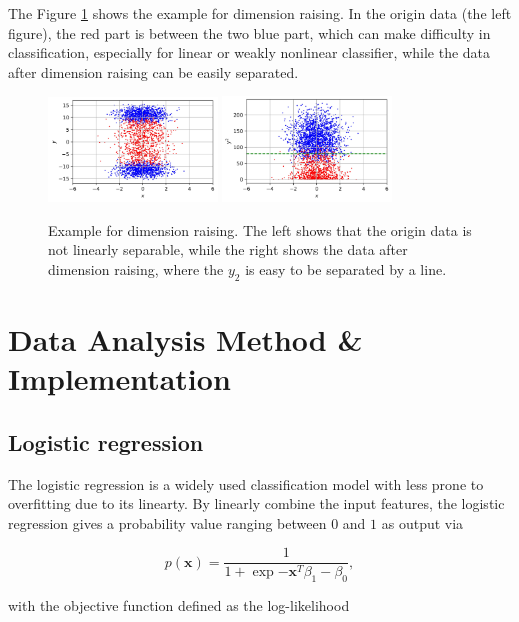 \documentclass[11pt]{article}
\begin{document}
The Figure \ref{sample-raising} shows the example for dimension raising. In the origin data (the left figure), the red part is between the two blue part, which can make difficulty in classification, especially for linear or weakly nonlinear classifier, while the data after dimension raising can be easily separated.

\begin{figure}[H]
  \centering
  \includegraphics[width=0.4\textwidth]{./figure/Sample-Raising-1.jpg}
  \includegraphics[width=0.4\textwidth]{./figure/Sample-Raising-2.jpg}
  \caption{Example for dimension raising. The left shows that the origin data is not linearly separable, while the right shows the data after dimension raising, where the $y_2$ is easy to be separated by a line.}
  \label{sample-raising}
\end{figure}

\section{Data Analysis Method \& Implementation}

\subsection{Logistic regression}

The logistic regression \cite{walker1967estimation} \cite{pohar2004comparison} is a widely used classification model with less prone to overfitting due to its linearty. By linearly combine the input features, the logistic regression gives a probability value ranging between $0$ and $1$ as output via

$$
  p (\mathbf{x}) = \frac{1}{1 + \exp{- \mathbf{x}^T \beta_1 - \beta_0}},
$$

\noindent with the objective function defined as the log-likelihood
\end{document}

